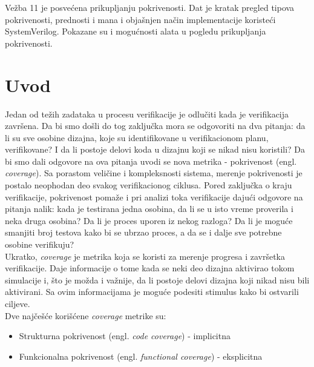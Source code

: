 %
% 

Vežba 11 je posvećena prikupljanju pokrivenosti. Dat je kratak pregled tipova
pokrivenosti, prednosti i mana i objašnjen način implementacije koristeći
SystemVerilog. Pokazane su i mogućnosti alata u pogledu prikupljanja
pokrivenosti.


\section{Uvod}

Jedan od težih zadataka u procesu verifikacije je odlučiti kada je verifikacija
završena. Da bi smo došli do tog zaključka mora se odgovoriti na dva pitanja: da
li su sve osobine dizajna, koje su identifikovane u verifikacionom planu,
verifikovane? I da li postoje delovi koda u dizajnu koji se nikad nisu
koristili? Da bi smo dali odgovore na ova pitanja uvodi se nova metrika -
pokrivenost (engl. \emph{coverage}). Sa porastom veličine i kompleksnosti
sistema, merenje pokrivenosti je postalo neophodan deo svakog verifikacionog
ciklusa. Pored zaključka o kraju verifikacije, pokrivenost pomaže i pri analizi
toka verifikacije dajući odgovore na pitanja nalik: kada je testirana jedna
osobina, da li se u isto vreme proverila i neka druga osobina? Da li je proces
uporen iz nekog razloga? Da li je moguće smanjiti broj testova kako bi se ubrzao
proces, a da se i dalje sve potrebne osobine verifikuju?\\

Ukratko, \emph{coverage} je metrika koja se koristi za merenje progresa i
završetka verifikacije. Daje informacije o tome kada se neki deo dizajna
aktivirao tokom simulacije i, što je možda i važnije, da li postoje delovi
dizajna koji nikad nisu bili aktivirani. Sa ovim informacijama je moguće
podesiti stimulus kako bi ostvarili ciljeve.\\

Dve najčešće korišćene \emph{coverage} metrike su:

\begin{itemize}
\item Strukturna pokrivenost (engl. \emph{code coverage}) - implicitna
\item Funkcionalna pokrivenost (engl. \emph{functional coverage}) - eksplicitna
\end{itemize}

